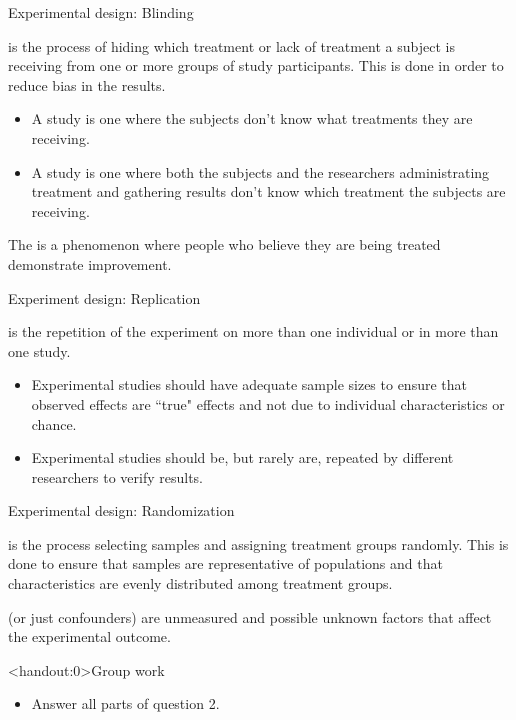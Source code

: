 \documentclass[xcolor=table, aspectratio=169, bigger, handout]{beamer}
\begin{document}
\begin{frame}{Experimental design: Blinding}
\begin{block}{}
 is the process of hiding which treatment or lack of treatment a subject is receiving from one or more groups of study participants. This is done in order to reduce bias in the results.

\begin{itemize}
\pause\item A  study is one where the subjects don't know what treatments they are receiving.

\pause\item A  study is one where both the subjects and the researchers administrating treatment and gathering results don't know which treatment the subjects are receiving.
\end{itemize}
\end{block}

\pause
\begin{block}{}
The  is a phenomenon where people who believe they are being treated demonstrate improvement.
\end{block}
\end{frame}

\begin{frame}{Experiment design: Replication}
\begin{block}{}
 is the repetition of the experiment on more than one individual or in more than one study.

\begin{itemize}
\pause\item Experimental studies should have adequate sample sizes to ensure that observed effects are ``true" effects and not due to individual characteristics or chance.
\pause\item Experimental studies should be, but rarely are, repeated by different researchers to verify results.
\end{itemize}
\end{block}
\end{frame}

\begin{frame}{Experimental design: Randomization}

\begin{block}{}
 is the process selecting samples and assigning treatment groups randomly. This is done to ensure that samples are representative of populations and that characteristics are evenly distributed among treatment groups.
\end{block}

\pause
\begin{block}{}
 (or just confounders) are unmeasured and possible unknown factors that affect the experimental outcome. 
\end{block}
\end{frame}

\begin{frame}<handout:0>{Group work}
\begin{block}{}
\begin{itemize}
\item Answer all parts of question 2.
\end{itemize}
\end{block}
\end{frame}
\end{document}
